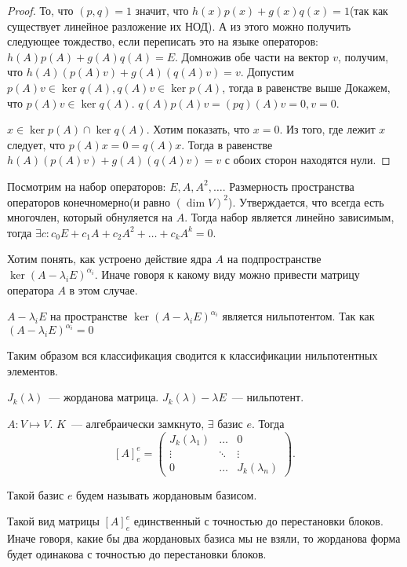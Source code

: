 \begin{proof}
    То, что $(p,q) = 1$ значит, что 
    $h(x)p(x) + g(x)q(x) = 1$(так как существует линейное разложение их НОД).
    А из этого можно получить следующее тождество, если переписать это на языке операторов: $h(A)p(A) + g(A) q(A) = E$.
    Домножив обе части на вектор $v$, получим, что $h(A)(p(A)v) + g(A)(q(A)v) = v$.
    Допустим $p(A)v\in \ker q(A), q(A)v\in \ker p(A)$, тогда в равенстве выше 
    Докажем, что $p(A)v\in \ker q(A)$. $q(A)p(A)v = (pq)(A)v = 0, v = 0$.

    $x\in \ker p(A)\cap \ker q(A)$. Хотим показать, что $x = 0$.
    Из того, где лежит  $x$ следует, что $p(A)x = 0 = q(A)x$.
    Тогда в равенстве $h(A)(p(A)v) + g(A)(q(A)v) = v$ с обоих сторон находятся нули.
\end{proof}
\begin{remark}
    Посмотрим на набор операторов: $E, A, A^2, \dots$. Размерность пространства операторов конечномерно(и равно $(\dim V)^2$).
    Утверждается, что всегда есть многочлен, который обнуляется на $A$.
    Тогда набор является линейно зависимым, тогда $\exists c\colon c_0E + c_1A + c_2A^2 + \dots +c_k A^k = 0$.
\end{remark}
\begin{motivation}
    Хотим понять, как устроено действие ядра $A$ на подпространстве $\ker (A - \lambda_iE)^{\alpha_i}$.
    Иначе говоря к какому виду можно привести матрицу оператора $A$ в этом случае.
\end{motivation}
\begin{remark}
    $A - \lambda_iE$ на пространстве $\ker(A - \lambda_iE)^{\alpha_i}$ является нильпотентом.
    Так как $(A - \lambda_iE)^{\alpha_i} = 0$
\end{remark}
\begin{motivation}
    Таким образом вся классификация сводится к классификации нильпотентных элементов.
\end{motivation}
\begin{remark}
    $J_k(\lambda)$~--- жорданова матрица.
    $J_k(\lambda) - \lambda E$~--- нильпотент.
\end{remark}
\begin{theorem}
    $A\colon V\mapsto V$. $K$~--- алгебраически замкнуто, $\exists$ базис $e$.
    Тогда 
     \[
         [A]^e_e =
         \begin{pmatrix}
             J_k(\lambda_1) & \dots & 0\\
             \vdots & \ddots & \vdots\\
             0 & \dots & J_k(\lambda_n)
         \end{pmatrix}
    .\] 
    \begin{definition}
        Такой базис $e$ будем называть жордановым базисом.
    \end{definition}
    Такой вид матрицы $[A]^e_e$ единственный с точностью до перестановки блоков.
    Иначе говоря, какие бы два жордановых базиса мы не взяли, то жорданова форма будет одинакова с точностью до перестановки блоков.
\end{theorem}

